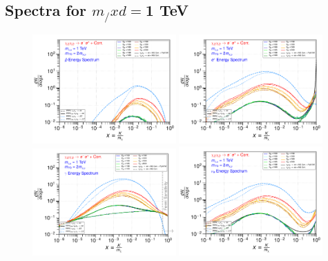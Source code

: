 \documentclass[epj,nopacs,fleqn]{svjour}
\begin{document}
\subsection{Spectra for $m_/xd=$1 TeV}
\begin{figure}[!h]
	\centering
	\subfigure
	{ \includegraphics[width=0.49\textwidth]{Fig/xdxd_ee_eeZ_eveW/1_antiprotons_ee_eeZ_eveW_1.pdf}}
	\subfigure
	{ \includegraphics[width=0.49\textwidth]{Fig/xdxd_ee_eeZ_eveW/1_positrons_ee_eeZ_eveW_1.pdf}}
	\subfigure
	{ \includegraphics[width=0.49\textwidth]{Fig/xdxd_ee_eeZ_eveW/1_gammas_ee_eeZ_eveW_1.pdf}}
	\subfigure
	{ \includegraphics[width=0.49\textwidth]{Fig/xdxd_ee_eeZ_eveW/1_neutrinos_e_ee_eeZ_eveW_1.pdf}}

\end{figure}
\end{document}
